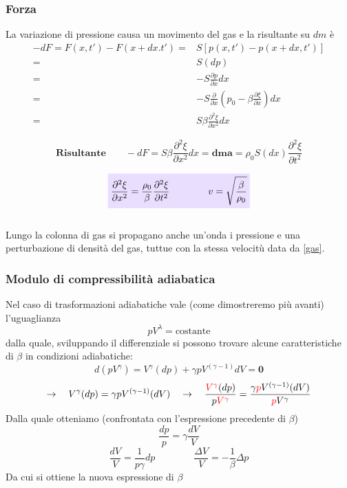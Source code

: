 \documentclass[x11names]{report}
\newcommand{\viola}[1]{\colorbox{yred}{$\displaystyle #1$}}
\begin{document}
	\subsubsection{Forza}
	La variazione di pressione causa un movimento del gas e la risultante su $dm$ è 
	\begin{align*}
		-dF = F(x,t') - F(x+dx.t') =& S\left[p(x,t') - p(x+dx,t')\right] \\
		=& S(dp) \\
		=& -S\frac{\partial p}{\partial x}dx \\
		=& -S\frac{\partial}{\partial x}\left(p_0 - \beta\frac{\partial \xi}{\partial x}\right)dx \\
		=& S\beta\frac{\partial^2\xi}{\partial x^2}dx
	\end{align*}
	
	\[ 
	\textbf{Risultante} \qquad	-dF = S\beta\frac{\partial^2\xi}{\partial x^2}dx  \mathbf{= dm a} = \rho_0 S(dx) \frac{\partial^2 \xi}{\partial t^2} 
	\]
	
	\begin{equation} \label{gas}
		\viola{\frac{\partial^2\xi}{\partial x^2} = \frac{\rho_0}{\beta} \frac{\partial^2 \xi}{\partial t^2} \qquad \qquad v = \sqrt{\frac{\beta}{\rho_0}}}
	\end{equation}
	\\
	
	Lungo la colonna di gas si propagano anche un'onda i pressione e una perturbazione di densità del gas, tuttue con la stessa velocitù data da \ref{gas}.
	
	\subsubsection{Modulo di compressibilità adiabatica}
	Nel caso di trasformazioni adiabatiche vale (come dimostreremo più avanti) l'uguaglianza
	\[
	pV^\lambda = \text{costante}
	\]
	dalla quale, sviluppando il differenziale si possono trovare alcune caratteristiche di \(\beta\) in condizioni adiabatiche:
	\[
	d\left(pV^\gamma\right) = V^\gamma (dp) + \gamma p V^{(\gamma - 1)}dV \boldsymbol{= 0}
	\]
	\[ 
	\to \quad  V^\gamma (dp) = \gamma p V^{(\gamma - 1)}(dV) \quad \to \quad \frac{\textcolor{red}{V^\gamma} (dp)}{p\textcolor{red}{V^\gamma}} = \frac{\gamma \textcolor{red}{p} V^{(\gamma - 1)}(dV)}{\textcolor{red}{p}V^\gamma}
	\]
	Dalla quale otteniamo (confrontata con l'espressione precedente di \(\beta\))
	\[ 
	\frac{dp}{p} = \gamma\frac{dV}{V} 
	\]
	\[ 
	\frac{dV}{V} = \frac{1}{p\gamma}dp  \qquad \qquad \frac{\Delta V}{V} = -\frac{1}{\beta} \Delta p
	\]
	Da cui si ottiene la nuova espressione di \(\beta\)
	
\end{document}
